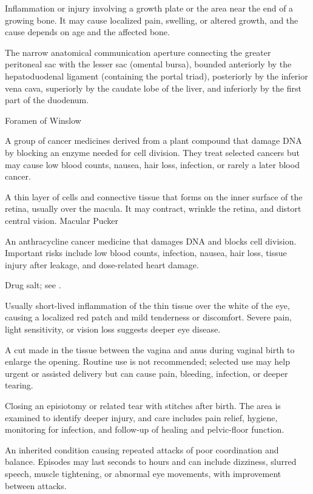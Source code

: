  Inflammation or injury involving a growth plate or the area near the end of a growing bone. It may cause localized pain, swelling, or altered growth, and the cause depends on age and the affected bone.

 The narrow anatomical communication aperture connecting the greater peritoneal sac with the lesser sac (omental bursa), bounded anteriorly by the hepatoduodenal ligament (containing the portal triad), posteriorly by the inferior vena cava, superiorly by the caudate lobe of the liver, and inferiorly by the first part of the duodenum.

\synonyms
Foramen of Winslow

 A group of cancer medicines derived from a plant compound that damage DNA by blocking an enzyme needed for cell division. They treat selected cancers but may cause low blood counts, nausea, hair loss, infection, or rarely a later blood cancer.

 A thin layer of cells and connective tissue that forms on the inner surface of the retina, usually over the macula. It may contract, wrinkle the retina, and distort central vision.
\synonyms
Macular Pucker

 An anthracycline cancer medicine that damages DNA and blocks cell division. Important risks include low blood counts, infection, nausea, hair loss, tissue injury after leakage, and dose-related heart damage.

 Drug salt; see .

 Usually short-lived inflammation of the thin tissue over the white of the eye, causing a localized red patch and mild tenderness or discomfort. Severe pain, light sensitivity, or vision loss suggests deeper eye disease.

 A cut made in the tissue between the vagina and anus during vaginal birth to enlarge the opening. Routine use is not recommended; selected use may help urgent or assisted delivery but can cause pain, bleeding, infection, or deeper tearing.

 Closing an episiotomy or related tear with stitches after birth. The area is examined to identify deeper injury, and care includes pain relief, hygiene, monitoring for infection, and follow-up of healing and pelvic-floor function.

 An inherited condition causing repeated attacks of poor coordination and balance. Episodes may last seconds to hours and can include dizziness, slurred speech, muscle tightening, or abnormal eye movements, with improvement between attacks.

